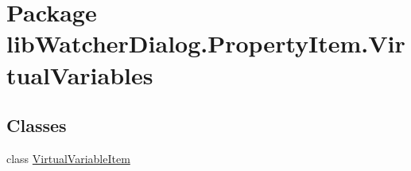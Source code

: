 \hypertarget{namespacelib_watcher_dialog_1_1_property_item_1_1_virtual_variables}{\section{Package lib\+Watcher\+Dialog.\+Property\+Item.\+Virtual\+Variables}
\label{namespacelib_watcher_dialog_1_1_property_item_1_1_virtual_variables}
}
\subsection*{Classes}
\begin{DoxyCompactItemize}
\item 
class \hyperlink{classlib_watcher_dialog_1_1_property_item_1_1_virtual_variables_1_1_virtual_variable_item}{Virtual\+Variable\+Item}
\end{DoxyCompactItemize}
